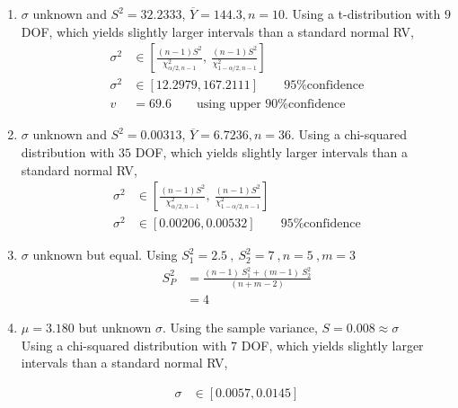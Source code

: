 \begin{enumerate}
	\item  $ \sigma $ unknown and $ S^2 = 32.2333 $, $ \overline{Y} = 144.3, n = 10$. Using a t-distribution with $ 9 $ DOF, which yields slightly larger intervals than a standard normal RV,
	\begin{subequations}
		\begin{align}
			\sigma^2 &\in \left[\frac{(n-1)S^2}{\chi^2_{\alpha/2, n-1}} ,\  \frac{(n-1)S^2}{\chi^2_{1 -\alpha/2, n-1}} \right] \nonumber \\
			\sigma^2 &\in \left[ 12.2979, 167.2111 \right] \qquad \text{95\% confidence} \nonumber \\
			v &= 69.6 \qquad \text{using upper 90\% confidence}
		\end{align}
	\end{subequations}
	
	\item  $ \sigma $ unknown and $ S^2 = 0.00313 $, $ \overline{Y} = 6.7236, n = 36$. Using a chi-squared distribution with $ 35 $ DOF, which yields slightly larger intervals than a standard normal RV,
	\begin{subequations}
		\begin{align}
			\sigma^2 &\in \left[\frac{(n-1)S^2}{\chi^2_{\alpha/2, n-1}} ,\  \frac{(n-1)S^2}{\chi^2_{1 -\alpha/2, n-1}} \right] \nonumber \\
			\sigma^2 &\in \left[ 0.00206, 0.00532 \right] \qquad \text{95\% confidence} 
		\end{align}
	\end{subequations}

	\item  $ \sigma $ unknown but equal. Using $ S_1^2 = 2.5\ ,\ S_2^2 = 7\ , n = 5\ , m = 3 $\\
	\begin{subequations}
		\begin{align}
			S_P^2 &= \frac{(n-1)\ S_1^2 + (m-1)\ S_2^2}{(n+m-2)} \nonumber \\
			&= 4
		\end{align}
	\end{subequations}

	\item  $ \mu = 3.180 $ but unknown $ \sigma $. Using the sample variance, $ S = 0.008 \approx \sigma $\\
	Using a chi-squared distribution with $ 7 $ DOF, which yields slightly larger intervals than a standard normal RV,
	
	\begin{subequations}
		\begin{align}
			\sigma &\in [0.0057, 0.0145]
		\end{align}
	\end{subequations}


\end{enumerate}
